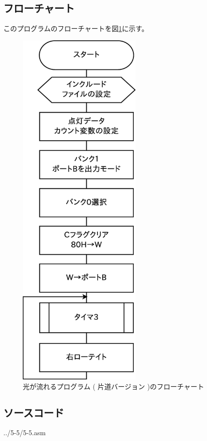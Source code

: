 \documentclass[a4paper,12pt]{ujarticle}
\begin{document}
  \subsection{フローチャート}
  このプログラムのフローチャートを図\ref{fig:flow_5-5}に示す。
  \begin{figure}[htbp]
   \begin{center}
    \includegraphics[height=185mm]{Diagram5-5.eps}
   \end{center}
   \caption{光が流れるプログラム ( 片道バージョン )のフローチャート}
   \label{fig:flow_5-5}
  \end{figure}
   \clearpage
  \subsection{ソースコード}
   \begin{lstinputlisting}[basicstyle=\ttfamily\footnotesize, frame=single,numbers=left]
    {../5-5/5-5.asm}
   \end{lstinputlisting}
   \clearpage
\end{document}
